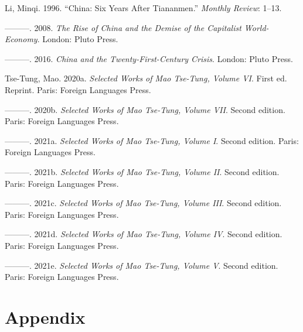 \documentclass[
  11pt,
]{article}
\newlength{\cslhangindent}
\newlength{\cslentryspacingunit} %
\newenvironment{CSLReferences}[2] %
 {%
  \setlength{\parindent}{0pt}
  \ifodd #1
  \let\oldpar\par
  \def\par{\hangindent=\cslhangindent\oldpar}
  \fi
  \setlength{\parskip}{#2\cslentryspacingunit}
 }%
 {}
\begin{document}
\hypertarget{refs}{}
\begin{CSLReferences}{1}{0}
\leavevmode{}%
Li, Minqi. 1996. {``China: {Six Years After Tiananmen}.''} \emph{Monthly
Review}: 1--13.

\leavevmode{}%
---------. 2008. \emph{The Rise of {China} and the Demise of the
Capitalist World-Economy}. {London}: {Pluto Press}.

\leavevmode{}%
---------. 2016. \emph{China and the Twenty-First-Century Crisis}.
{London}: {Pluto Press}.

\leavevmode{}%
Tse-Tung, Mao. 2020a. \emph{Selected {Works} of {Mao Tse-Tung}, {Volume
VI}}. First ed. Reprint. {Paris}: {Foreign Languages Press}.

\leavevmode{}%
---------. 2020b. \emph{Selected {Works} of {Mao Tse-Tung}, {Volume
VII}}. Second edition. {Paris}: {Foreign Languages Press}.

\leavevmode{}%
---------. 2021a. \emph{Selected {Works} of {Mao Tse-Tung}, {Volume I}}.
Second edition. {Paris}: {Foreign Languages Press}.

\leavevmode{}%
---------. 2021b. \emph{Selected {Works} of {Mao Tse-Tung}, {Volume
II}}. Second edition. {Paris}: {Foreign Languages Press}.

\leavevmode{}%
---------. 2021c. \emph{Selected {Works} of {Mao Tse-Tung}, {Volume
III}}. Second edition. {Paris}: {Foreign Languages Press}.

\leavevmode{}%
---------. 2021d. \emph{Selected {Works} of {Mao Tse-Tung}, {Volume
IV}}. Second edition. {Paris}: {Foreign Languages Press}.

\leavevmode{}%
---------. 2021e. \emph{Selected {Works} of {Mao Tse-Tung}, {Volume V}}.
Second edition. {Paris}: {Foreign Languages Press}.

\end{CSLReferences}

\singlespace
\newpage

\hypertarget{appendix}{%
\section*{Appendix}\label{appendix}}
\end{document}
